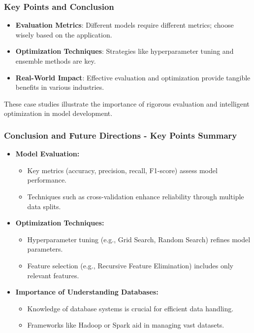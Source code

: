 \documentclass[aspectratio=169]{beamer}
\begin{document}
\begin{frame}[fragile]
    \frametitle{Key Points and Conclusion}
    \begin{itemize}
        \item \textbf{Evaluation Metrics}: Different models require different metrics; choose wisely based on the application.
        \item \textbf{Optimization Techniques}: Strategies like hyperparameter tuning and ensemble methods are key.
        \item \textbf{Real-World Impact}: Effective evaluation and optimization provide tangible benefits in various industries.
    \end{itemize}
    
    These case studies illustrate the importance of rigorous evaluation and intelligent optimization in model development.
\end{frame}

\begin{frame}[fragile]
    \frametitle{Conclusion and Future Directions - Key Points Summary}
    \begin{itemize}
        \item \textbf{Model Evaluation:}
        \begin{itemize}
            \item Key metrics (accuracy, precision, recall, F1-score) assess model performance.
            \item Techniques such as cross-validation enhance reliability through multiple data splits.
        \end{itemize}
        
        \item \textbf{Optimization Techniques:}
        \begin{itemize}
            \item Hyperparameter tuning (e.g., Grid Search, Random Search) refines model parameters.
            \item Feature selection (e.g., Recursive Feature Elimination) includes only relevant features.
        \end{itemize}

        \item \textbf{Importance of Understanding Databases:}
        \begin{itemize}
            \item Knowledge of database systems is crucial for efficient data handling.
            \item Frameworks like Hadoop or Spark aid in managing vast datasets.
        \end{itemize}
    \end{itemize}
\end{frame}
\end{document}
